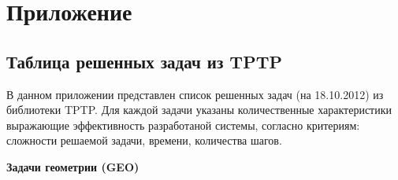 \chapter*{Приложение}






\section*{Таблица решенных задач из TPTP}
В данном приложении представлен список решенных задач (на 18.10.2012) из библиотеки TPTP. Для каждой задачи указаны количественные характеристики выражающие эффективность разработаной системы, согласно критериям: сложности решаемой задачи, времени, количества шагов.

\textbf{Задачи геометрии (GEO)}

